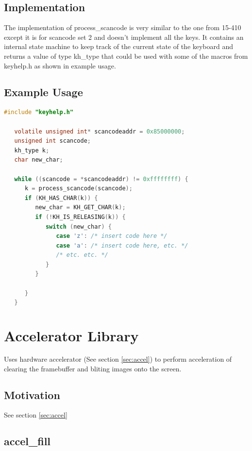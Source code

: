 \documentclass[10pt]{report}
\begin{document}
\subsection{Implementation}

The implementation of process\_scancode is very similar to the one from 15-410 except it is for scancode set 2 and doesn't implement all the keys. It contains an internal state machine to keep track of the current state of the keyboard and returns a value of type kh\_type that could be used with some of the macros from keyhelp.h as shown in example usage.

\subsection{Example Usage}

\begin{lstlisting}[basicstyle=\footnotesize,language=C]
   #include "keyhelp.h"
 
   volatile unsigned int* scancodeaddr = 0x85000000;
   unsigned int scancode;
   kh_type k;
   char new_char;
 
   while ((scancode = *scancodeaddr) != 0xffffffff) {
      k = process_scancode(scancode);
      if (KH_HAS_CHAR(k)) {
         new_char = KH_GET_CHAR(k);
         if (!KH_IS_RELEASING(k)) {
            switch (new_char) {
               case 'z': /* insert code here */
               case 'a': /* insert code here, etc. */ 
               /* etc. etc. */
            }
         }
 
      }
   }
\end{lstlisting}

\section{Accelerator Library}

\label{sec:accel_lib}

Uses hardware accelerator (See section \ref{sec:accel}) to perform acceleration of clearing the framebuffer and bliting images onto the screen.

\subsection{Motivation}

See section \ref{sec:accel}

\subsection{accel\_fill}
\end{document}
